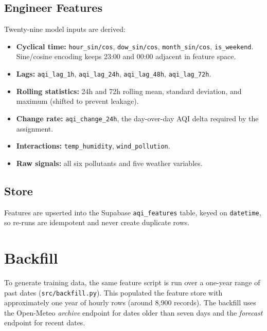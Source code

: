 \documentclass[11pt,a4paper]{article}
\begin{document}
\subsection{Engineer Features}
Twenty-nine model inputs are derived:

\begin{itemize}[leftmargin=1.4em]
  \item \textbf{Cyclical time:} \texttt{hour\_sin/cos}, \texttt{dow\_sin/cos},
        \texttt{month\_sin/cos}, \texttt{is\_weekend}. Sine/cosine encoding keeps
        23:00 and 00:00 adjacent in feature space.
  \item \textbf{Lags:} \texttt{aqi\_lag\_1h}, \texttt{aqi\_lag\_24h},
        \texttt{aqi\_lag\_48h}, \texttt{aqi\_lag\_72h}.
  \item \textbf{Rolling statistics:} 24h and 72h rolling mean, standard
        deviation, and maximum (shifted to prevent leakage).
  \item \textbf{Change rate:} \texttt{aqi\_change\_24h}, the day-over-day AQI
        delta required by the assignment.
  \item \textbf{Interactions:} \texttt{temp\_humidity}, \texttt{wind\_pollution}.
  \item \textbf{Raw signals:} all six pollutants and five weather variables.
\end{itemize}

\subsection{Store}
Features are upserted into the Supabase \texttt{aqi\_features} table, keyed on
\texttt{datetime}, so re-runs are idempotent and never create duplicate rows.

\section{Backfill}
To generate training data, the same feature script is run over a one-year range
of past dates (\texttt{src/backfill.py}). This populated the feature store with
approximately one year of hourly rows (around 8,900 records). The backfill uses
the Open-Meteo \emph{archive} endpoint for dates older than seven days and the
\emph{forecast} endpoint for recent dates.

\end{document}
